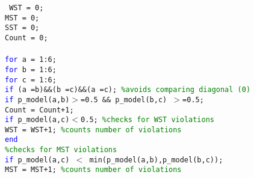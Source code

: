 \texttt{
\noindent
\hspace{-2.3mm}WST = 0; \\ 
\hspace{1mm}MST = 0; \\ 
\hspace{1mm}SST = 0; \\ 
\hspace{1mm}Count = 0; \\ 
\noindent
\hspace{1mm} \\ 
\hspace{1mm}\textcolor{blue}{for} a = 1:6; \\ 
\hspace{1mm}\indent \textcolor{blue}{for} b = 1:6; \\ 
\hspace{1mm}\indent \indent \textcolor{blue}{for} c = 1:6; \\ 
\hspace{1mm}\indent \indent \indent \textcolor{blue}{if} (a~=b)\&\&(b~=c)\&\&(a~=c); \textcolor{green}{\%avoids comparing diagonal (0) }\\ 
\hspace{1mm}\indent \indent \indent \indent \textcolor{blue}{if} p\_model(a,b)$>$=0.5 \&\& p\_model(b,c) $>$=0.5; \\ 
\hspace{1mm}\indent \indent \indent \indent \indent Count = Count+1; \\ 
\hspace{1mm}\indent \indent \indent \indent \indent \textcolor{blue}{if} p\_model(a,c)$<$0.5; \textcolor{green}{\%checks for WST violations }\\ 
\hspace{1mm}\indent \indent \indent \indent \indent \indent \indent WST = WST+1; \textcolor{green}{\%counts number of violations }\\ 
\hspace{1mm}\indent \indent \indent \indent \indent \indent \textcolor{blue}{end} \\ 
\hspace{1mm}\indent \indent \indent\indent \indent \indent \indent\indent \textcolor{green}{\%checks for MST violations }\\ 
\hspace{1mm}\indent \indent \indent \indent \indent \indent \indent \textcolor{blue}{if} p\_model(a,c) $<$ min(p\_model(a,b),p\_model(b,c)); \\ 
\hspace{1mm}\indent \indent \indent \indent \indent \indent \indent \indent MST = MST+1; \textcolor{green}{\%counts number of violations }\\ 
}
